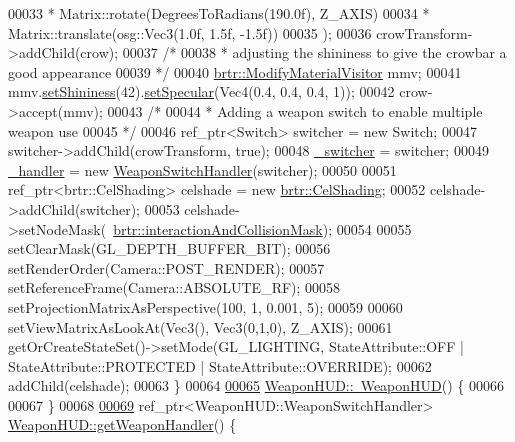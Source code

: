 \begin{DoxyCode}
00033        * Matrix::rotate(DegreesToRadians(190.0f), Z\_AXIS)
00034        * Matrix::translate(osg::Vec3(1.0f, 1.5f, -1.5f))
00035                                 );
00036         crowTransform->addChild(crow);
00037     \textcolor{comment}{/*}
00038 \textcolor{comment}{     * adjusting the shininess to give the crowbar a good appearance }
00039 \textcolor{comment}{     */}
00040         \hyperlink{classbrtr_1_1_modify_material_visitor}{brtr::ModifyMaterialVisitor} mmv;
00041         mmv.\hyperlink{classbrtr_1_1_modify_material_visitor_a698aa0c31f8c5add503d47bc9898eec3}{setShininess}(42).\hyperlink{classbrtr_1_1_modify_material_visitor_a7a8a5a938799c5193645d86aa6dc6a7c}{setSpecular}(Vec4(0.4, 0.4, 0.4, 1));
00042         crow->accept(mmv);
00043     \textcolor{comment}{/*}
00044 \textcolor{comment}{     * Adding a weapon switch to enable multiple weapon use}
00045 \textcolor{comment}{     */}
00046         ref\_ptr<Switch> switcher = \textcolor{keyword}{new} Switch;
00047         switcher->addChild(crowTransform, \textcolor{keyword}{true});
00048         \hyperlink{classbrtr_1_1_weapon_h_u_d_a32d5e498c15faa87f3bcfa83ca6c5b0e}{\_switcher} = switcher;
00049         \hyperlink{classbrtr_1_1_weapon_h_u_d_a4ebf9d9e600e3a6b9f5d8601c084ee51}{\_handler} = \textcolor{keyword}{new} \hyperlink{classbrtr_1_1_weapon_h_u_d_1_1_weapon_switch_handler}{WeaponSwitchHandler}(switcher);
00050 
00051         ref\_ptr<brtr::CelShading> celshade = \textcolor{keyword}{new} \hyperlink{classbrtr_1_1_cel_shading}{brtr::CelShading};
00052         celshade->addChild(switcher);
00053         celshade->setNodeMask(~\hyperlink{namespacebrtr_a21ab851f18c0c85fa006766034833a4f}{brtr::interactionAndCollisionMask});
00054 
00055         setClearMask(GL\_DEPTH\_BUFFER\_BIT);
00056         setRenderOrder(Camera::POST\_RENDER);
00057         setReferenceFrame(Camera::ABSOLUTE\_RF);
00058         setProjectionMatrixAsPerspective(100, 1, 0.001, 5);
00059         
00060         setViewMatrixAsLookAt(Vec3(), Vec3(0,1,0), Z\_AXIS);
00061         getOrCreateStateSet()->setMode(GL\_LIGHTING, StateAttribute::OFF | StateAttribute::PROTECTED | 
      StateAttribute::OVERRIDE);
00062         addChild(celshade);
00063     \}
00064 
\hypertarget{_weapon_h_u_d_8cpp_source_l00065}{}\hyperlink{classbrtr_1_1_weapon_h_u_d_aaaa6c5e92034b7efb6194032f6ffca0f}{00065}     \hyperlink{classbrtr_1_1_weapon_h_u_d_aaaa6c5e92034b7efb6194032f6ffca0f}{WeaponHUD::~WeaponHUD}() \{
00066 
00067     \}
00068 
\hypertarget{_weapon_h_u_d_8cpp_source_l00069}{}\hyperlink{classbrtr_1_1_weapon_h_u_d_a6a9a434ff3aa3861caf030763772ac74}{00069}     ref\_ptr<WeaponHUD::WeaponSwitchHandler> \hyperlink{classbrtr_1_1_weapon_h_u_d_a6a9a434ff3aa3861caf030763772ac74}{WeaponHUD::getWeaponHandler}() \{

\end{DoxyCode}
